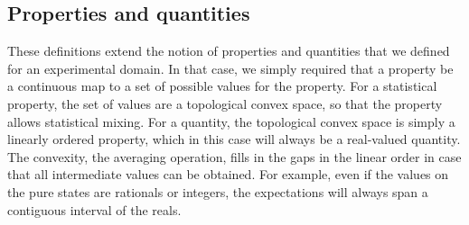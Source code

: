 \subsection{Properties and quantities}

These definitions extend the notion of properties and quantities that we defined for an experimental domain. In that case, we simply required that a property be a continuous map to a set of possible values for the property. For a statistical property, the set of values are a topological convex space, so that the property allows statistical mixing. For a quantity, the topological convex space is simply a linearly ordered property, which in this case will always be a real-valued quantity. The convexity, the averaging operation, fills in the gaps in the linear order in case that all intermediate values can be obtained. For example, even if the values on the pure states are rationals or integers, the expectations will always span a contiguous interval of the reals.

